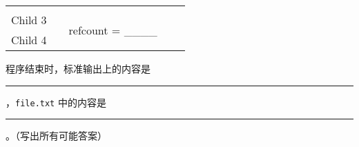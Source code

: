 \begin{problems}
\begin{table}[H]
\begin{tabular}{ccccc}
                &  &  & \multicolumn{1}{c|}{} & \multicolumn{1}{c|}{} \\ \cline{1-1} \cline{3-3}
                \multicolumn{1}{|c|}{Child 3} & \multicolumn{1}{c|}{} & \multicolumn{1}{c|}{\multirow{2}{*}{refcount = \_\_\_\_}} & \multicolumn{1}{c|}{} & \multicolumn{1}{c|}{} \\ \cline{1-1}
                \multicolumn{1}{|c|}{Child 4} & \multicolumn{1}{c|}{} & \multicolumn{1}{c|}{} & \multicolumn{1}{c|}{} & \multicolumn{1}{c|}{} \\ \cline{1-1} \cline{3-3} \cline{5-5} 
            \end{tabular}
        \end{table}
        \qn 程序结束时，标准输出上的内容是 \rule{3.5cm}{0.25mm}，\verb|file.txt| 中的内容是 \rule{3.5cm}{0.25mm}。（写出所有可能答案）
    \end{problems}

